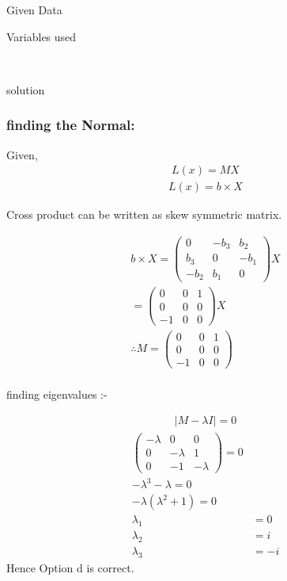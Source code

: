 \documentclass{beamer}
\begin{document}
\begin{frame}{Given Data}
    \begin{table}[h!]
    \centering
    
    \caption{Variables used}
    \label{table 1.9.1}
\end{table}\\
\end{frame}
\begin{frame}{solution}
    \frametitle{finding the Normal:}
Given, \begin{align}L(x) = MX
\end{align}
\begin{align}L(x) = b \times X\end{align}

Cross product can be written as skew symmetric matrix.
\end{frame}
\begin{frame}
\begin{align}b \times X = \begin{pmatrix}0 & -b_3 & b_2 \\b_3 & 0 & -b_1 \\-b_2 & b_1 & 0\end{pmatrix}X\\
=\begin{pmatrix}0 & 0 & 1 \\0 & 0 & 0 \\-1 & 0 & 0\end{pmatrix}X\\
\therefore M =\begin{pmatrix}0 & 0 & 1 \\0 & 0 & 0 \\-1 & 0 & 0\end{pmatrix}\\
\end{align}
\end{frame}
\begin{frame}
finding eigenvalues :-

\begin{align}|M - \lambda I| = 0\end{align}
\begin{align}
\begin{pmatrix}-\lambda & 0 & 0 \\0 & -\lambda & 1 \\0 & -1 & -\lambda\end{pmatrix} = 0\\
-\lambda^3 - \lambda = 0\\
-\lambda(\lambda^2 + 1) = 0\\
\lambda_1 &= 0 \\\lambda_2 &= i \\\lambda_3 &= -i
\end{align}
Hence Option d is correct.
\end{frame}
\end{document}
